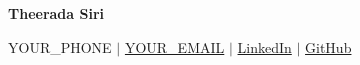 \begin{center}
    {\Huge \bfseries Theerada Siri} \\ \vspace{3pt}

    \small
    YOUR\_PHONE
    $|$
    \href{mailto:YOUR_EMAIL}{YOUR\_EMAIL}
    $|$
    \href{YOUR_LINKEDIN_URL}{LinkedIn}
    $|$
    \href{https://github.com/Cellul4r}{GitHub}
\end{center}

\vspace{-10pt}